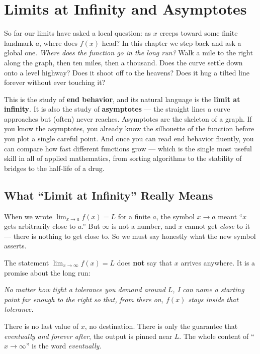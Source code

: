 \chapter{Limits at Infinity and Asymptotes}

So far our limits have asked a local question: as $x$ creeps toward some finite
landmark $a$, where does $f(x)$ head? In this chapter we step back and ask a
global one. \emph{Where does the function go in the long run?} Walk a mile to
the right along the graph, then ten miles, then a thousand. Does the curve
settle down onto a level highway? Does it shoot off to the heavens? Does it
hug a tilted line forever without ever touching it?

This is the study of \textbf{end behavior}, and its natural language is the
\textbf{limit at infinity}. It is also the study of \textbf{asymptotes} ---
the straight lines a curve approaches but (often) never reaches. Asymptotes are
the skeleton of a graph. If you know the asymptotes, you already know the
silhouette of the function before you plot a single careful point. And once you
can read end behavior fluently, you can compare how fast different functions
grow --- which is the single most useful skill in all of applied mathematics,
from sorting algorithms to the stability of bridges to the half-life of a drug.

\chapterline

\section{What ``Limit at Infinity'' Really Means}
\label{ch09:meaning}

When we wrote $\lim_{x\to a} f(x) = L$ for a finite $a$, the symbol $x\to a$
meant ``$x$ gets arbitrarily close to $a$.'' But $\infty$ is not a number, and
$x$ cannot get \emph{close} to it --- there is nothing to get close to. So we
must say honestly what the new symbol asserts.

\begin{happeningbox}
The statement $\lim_{x\to\infty} f(x) = L$ does \textbf{not} say that $x$
arrives anywhere. It is a promise about the long run:

\begin{center}
\emph{No matter how tight a tolerance you demand around $L$, I can name a
starting point far enough to the right so that, from there on, $f(x)$ stays
inside that tolerance.}
\end{center}

There is no last value of $x$, no destination. There is only the guarantee that
\emph{eventually and forever after}, the output is pinned near $L$. The whole
content of ``$x\to\infty$'' is the word \emph{eventually}.
\end{happeningbox}

